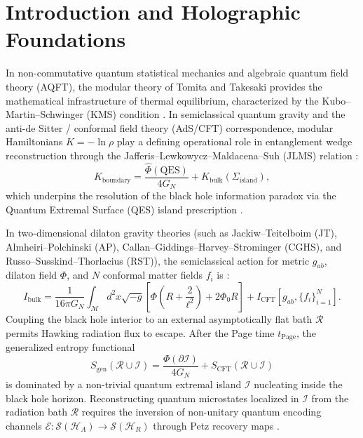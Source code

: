 \documentclass[11pt,a4paper]{article}
\theoremstyle{plain}
\theoremstyle{definition}
\begin{document}
\section{Introduction and Holographic Foundations}
In non-commutative quantum statistical mechanics and algebraic quantum field theory (AQFT), the modular theory of Tomita and Takesaki provides the mathematical infrastructure of thermal equilibrium, characterized by the Kubo--Martin--Schwinger (KMS) condition \cite{Haag1996,BratteliRobinson1997,Takesaki2002}. In semiclassical quantum gravity and the anti-de Sitter / conformal field theory (AdS/CFT) correspondence, modular Hamiltonians $K = -\ln\rho$ play a defining operational role in entanglement wedge reconstruction through the Jafferis--Lewkowycz--Maldacena--Suh (JLMS) relation \cite{Jafferis2016,Faulkner2013,Witten2018Modular}:
\begin{equation}
K_{\mathrm{boundary}} = \frac{\hat{\Phi}(\mathrm{QES})}{4 G_N} + K_{\mathrm{bulk}}(\Sigma_{\mathrm{island}}),
\label{eq:jlms_identity}
\end{equation}
which underpins the resolution of the black hole information paradox via the Quantum Extremal Surface (QES) island prescription \cite{Penington2020,Almheiri2019,Almheiri2020Page}.

In two-dimensional dilaton gravity theories (such as Jackiw--Teitelboim (JT), Almheiri--Polchinski (AP), Callan--Giddings--Harvey--Strominger (CGHS), and Russo--Susskind--Thor\-lacius (RST)), the semiclassical action for metric $g_{ab}$, dilaton field $\Phi$, and $N$ conformal matter fields $f_i$ is \cite{AlmheiriPolchinski2015,Russo1992}:
\begin{equation}
I_{\mathrm{bulk}} = \frac{1}{16\pi G_N} \int_{\mathcal{M}} d^2x \sqrt{-g} \left[ \Phi \left(R + \frac{2}{\ell^2}\right) + 2\Phi_0 R \right] + I_{\mathrm{CFT}}[g_{ab}, \{f_i\}_{i=1}^N].
\end{equation}
Coupling the black hole interior to an external asymptotically flat bath $\mathcal{R}$ permits Hawking radiation flux to escape. After the Page time $t_{\mathrm{Page}}$, the generalized entropy functional
\begin{equation}
S_{\mathrm{gen}}(\mathcal{R} \cup \mathcal{I}) = \frac{\Phi(\partial\mathcal{I})}{4 G_N} + S_{\mathrm{CFT}}(\mathcal{R} \cup \mathcal{I})
\end{equation}
is dominated by a non-trivial quantum extremal island $\mathcal{I}$ nucleating inside the black hole horizon. Reconstructing quantum microstates localized in $\mathcal{I}$ from the radiation bath $\mathcal{R}$ requires the inversion of non-unitary quantum encoding channels $\mathcal{E}: \mathcal{S}(\mathcal{H}_A) \to \mathcal{S}(\mathcal{H}_R)$ through Petz recovery maps \cite{Petz1986,Petz1988,HaydenPreskill2007,Cotler2019}.
\end{document}

